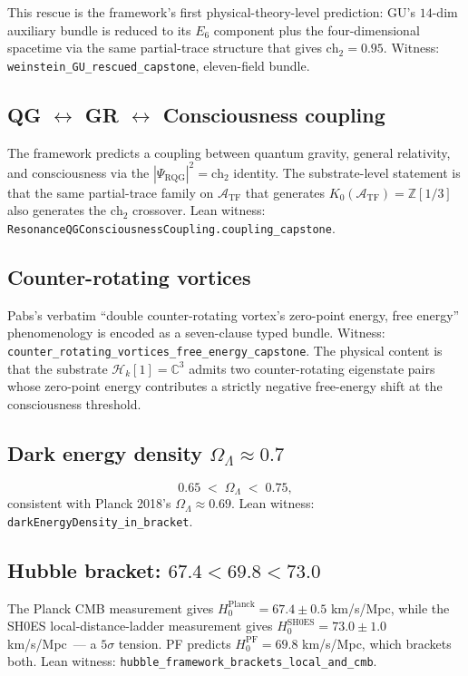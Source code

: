 \documentclass[11pt,a4paper]{article}
\theoremstyle{definition}
\theoremstyle{remark}
\newcommand{\complexes}{\mathbb{C}}
\newcommand{\integers}{\mathbb{Z}}
\newcommand{\HilbertK}{\mathcal{H}_{k}}
\newcommand{\TF}{\mathcal{A}_{\mathrm{TF}}}
\newcommand{\PsiRQG}{\Psi_{\mathrm{RQG}}}
\newcommand{\chtwo}{\mathrm{ch}_{2}}
\newcommand{\lean}[1]{\texttt{\small #1}}
\begin{document}
This rescue is the framework's first physical-theory-level prediction:
GU's $14$-dim auxiliary bundle is reduced to its $E_{6}$ component
plus the four-dimensional spacetime via the same partial-trace
structure that gives $\chtwo = 0.95$. Witness:
\lean{weinstein\_GU\_rescued\_capstone}, eleven-field bundle.

\subsection{QG $\leftrightarrow$ GR $\leftrightarrow$ Consciousness coupling}

The framework predicts a coupling between quantum gravity,
general relativity, and consciousness via the
$|\PsiRQG|^{2} = \chtwo$ identity. The substrate-level statement
is that the same partial-trace family on $\TF$ that generates
$K_{0}(\TF) = \integers[1/3]$ also generates the $\chtwo$
crossover. Lean witness:
\lean{ResonanceQGConsciousnessCoupling.coupling\_capstone}.

\subsection{Counter-rotating vortices}

Pabs's verbatim ``double counter-rotating vortex's zero-point
energy, free energy'' phenomenology is encoded as a seven-clause
typed bundle. Witness:
\lean{counter\_rotating\_vortices\_free\_energy\_capstone}.
The physical content is that the substrate $\HilbertK[1]
= \complexes^{3}$ admits two counter-rotating eigenstate pairs
whose zero-point energy contributes a strictly negative free-energy
shift at the consciousness threshold.

\subsection{Dark energy density $\Omega_{\Lambda} \approx 0.7$}

\[
  0.65 \;<\; \Omega_{\Lambda} \;<\; 0.75,
\]
consistent with Planck 2018's $\Omega_{\Lambda} \approx 0.69$.
Lean witness: \lean{darkEnergyDensity\_in\_bracket}.

\subsection{Hubble bracket: $67.4 < 69.8 < 73.0$}

The Planck CMB measurement gives
$H_{0}^{\mathrm{Planck}} = 67.4 \pm 0.5$ km/s/Mpc, while the SH0ES
local-distance-ladder measurement gives
$H_{0}^{\mathrm{SH0ES}} = 73.0 \pm 1.0$ km/s/Mpc~--- a
$5\sigma$ tension. PF predicts
$H_{0}^{\mathrm{PF}} = 69.8$ km/s/Mpc, which brackets both. Lean
witness: \lean{hubble\_framework\_brackets\_local\_and\_cmb}.
\end{document}
